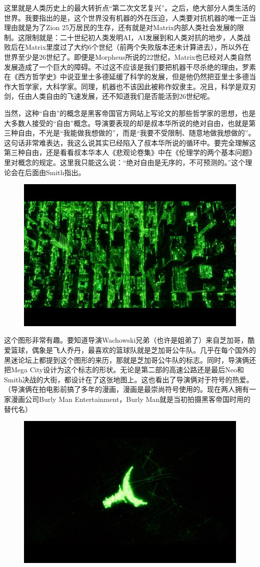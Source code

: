 \documentclass[UTF8]{ctexart}
\begin{document}
这里就是人类历史上的最大转折点“第二次文艺复兴”。之后，绝大部分人类生活的世界。我要指出的是，这个世界没有机器的外在压迫，人类要对抗机器的唯一正当理由就是为了Zion 25万居民的生存，还有就是对Matrix内部人类社会发展的限制。这限制就是：二十世纪初人类发明AI，AI发展到和人类对抗的地步，人类战败后在Matrix里度过了大约6个世纪（前两个失败版本还未计算进去），所以外在世界至少是26世纪了。即便是Morpheus所说的22世纪，Matrix也已经对人类自然发展造成了一个巨大的障碍。不过这不应该是我们要把机器干尽杀绝的理由，罗素在《西方哲学史》中说亚里士多德延缓了科学的发展，但是他仍然把亚里士多德当作大哲学家，大科学家。同理，机器也不该因此被称作奴隶主。况且，科学是双刃剑，任由人类自由的飞速发展，还不知道我们是否能活到26世纪呢。

当然，这种“自由”的概念是黑客帝国官方网站上写论文的那些哲学家的思想，也是大多数人接受的“自由”概念。导演要表现的却是叔本华所说的绝对自由，也就是第三种自由，不光是“我能做我想做的”，而是“我要不受限制、随意地做我想做的”。这句话非常难表达，我这么说其实已经陷入了叔本华所说的循环中。要完全理解这第三种自由，还是看看叔本华本人《悲观论卷集》中在《伦理学的两个基本问题》里对概念的规定。这里我只能这么说：“绝对自由是无序的，不可预测的。”这个理论会在后面由Smith指出。

\begin{figure}[htb]
\centering
\includegraphics[width=0.5\linewidth]{fig/1f716227f5c2fe03918f9d11.jpg}
\end{figure}

这个图形非常有趣。要知道导演Wachowski兄弟（也许是姐弟了）来自芝加哥，酷爱篮球，偶象是飞人乔丹，最喜欢的篮球队就是芝加哥公牛队。几乎在每个国外的黑迷论坛上都提到这个图形的来历，那就是芝加哥公牛队的标志。同时，导演俩还把Mega City设计为这个标志的形状。无论是第二部的高速公路还是最后Neo和Smith决战的大街，都设计在了这张地图上。这也看出了导演俩对于符号的热爱。（导演俩在拍电影前搞了多年的漫画，漫画是最崇尚符号使用的。现在两人拥有一家漫画公司Burly Man Entertainment，Burly Man就是当初拍摄黑客帝国时用的替代名）

\begin{figure}[htb]
\centering
\includegraphics[width=0.5\linewidth]{fig/245732fa9999af1ea8d31110.jpg}
\end{figure}
\end{document}
